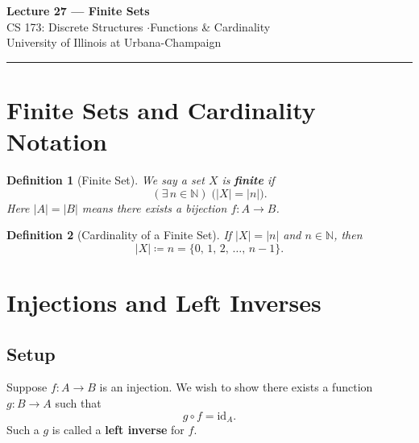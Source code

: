 \documentclass[11pt]{article}
\theoremstyle{defstyle}
\newtheorem{definition}{Definition}[section]
\theoremstyle{thmstyle}
\theoremstyle{notstyle}
\theoremstyle{cautionstyle}
\newcommand{\N}{\mathbb{N}}
\newcommand{\id}{\mathrm{id}}
\begin{document}
\begin{center}
  {\Large\bfseries Lecture 27 --- Finite Sets}\\[4pt]
  {\normalsize CS 173: Discrete Structures \quad$\cdot$\quad Functions \& Cardinality}\\[2pt]
  {\small\color{gray} University of Illinois at Urbana-Champaign}
\end{center}
\vspace{1em}\hrule\vspace{1.5em}

\section{Finite Sets and Cardinality Notation}

\begin{defbox}
\begin{definition}[Finite Set]
We say a set $X$ is \textbf{finite} if
\[
  (\exists\, n \in \N)\;\bigl(|X| = |n|\bigr).
\]
Here $|A| = |B|$ means there exists a bijection $f\colon A \to B$.
\end{definition}
\end{defbox}

\begin{defbox}
\begin{definition}[Cardinality of a Finite Set]
If $|X| = |n|$ and $n \in \N$, then
\[
  |X| \coloneqq n = \{0,\, 1,\, 2,\, \dots,\, n-1\}.
\]
\end{definition}
\end{defbox}

\section{Injections and Left Inverses}

\subsection{Setup}

Suppose $f\colon A \to B$ is an injection. We wish to show there exists a function
$g\colon B \to A$ such that
\[
  g \circ f = \id_A.
\]
Such a $g$ is called a \textbf{left inverse} for $f$.
\end{document}
